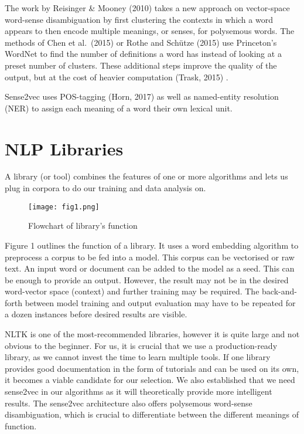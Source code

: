 \documentclass[12pt, usenames, dvipsnames]{report}
\begin{document}
\begin{flushleft}
The work by Reisinger \& Mooney (2010) \cite{reisinger2010} takes a new approach on vector-space word-sense disambiguation by first clustering the contexts in which a word appears to then encode multiple meanings, or senses, for polysemous words.
The methods of Chen et al.\ (2015) \cite{chen2015} or Rothe and Schütze (2015) \cite{rothe2015} use Princeton’s WordNet to find the number of definitions a word has instead of looking at a preset number of clusters.
These additional steps improve the quality of the output, but at the cost of heavier computation (Trask, 2015) \cite{trask2015}.

Sense2vec uses POS-tagging (Horn, 2017) \cite{horn2017} as well as named-entity resolution (NER) to assign each meaning of a word their own lexical unit.


\section{NLP Libraries}

A library (or tool) combines the features of one or more algorithms and lets us plug in corpora to do our training and data analysis on.

\vspace*{1.2em}
\begin{figure}[!htbp]
  \hspace*{-3.666em}
  \texttt{[image: fig1.png]}
  \caption{Flowchart of library's function}
  \label{fig:figure1}
\end{figure}
\vspace*{1.2em}

Figure 1 outlines the function of a library.
It uses a word embedding algorithm to preprocess a corpus to be fed into a model.
This corpus can be vectorised or raw text.
An input word or document can be added to the model as a seed.
This can be enough to provide an output.
However, the result may not be in the desired word-vector space (context) and further training may be required.
The back-and-forth between model training and output evaluation may have to be repeated for a dozen instances before desired results are visible.

NLTK is one of the most-recommended libraries, however it is quite large and not obvious to the beginner.
For us, it is crucial that we use a production-ready library, as we cannot invest the time to learn multiple tools.
If one library provides good documentation in the form of tutorials and can be used on its own, it becomes a viable candidate for our selection.
We also established that we need sense2vec in our algorithms as it will theoretically provide more intelligent results.
The sense2vec architecture also offers polysemous word-sense disambiguation, which is crucial to differentiate between the different meanings of function.


\end{flushleft}
\end{document}
